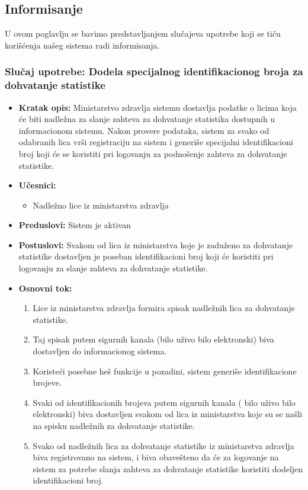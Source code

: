 \documentclass[titlepage]{article}
\begin{document}
\subsection{Informisanje}

U ovom poglavlju se bavimo predstavljanjem slučajeva upotrebe koji se tiču korišćenja našeg sistema radi informisanja.

\subsubsection{Slučaj upotrebe: Dodela specijalnog identifikacionog broja za dohvatanje statistike }
\begin{itemize}
    
\item \textbf{Kratak opis:} Ministarstvo zdravlja sistemu dostavlja podatke  o licima koja \'{c}e biti nadle\v{z}na za slanje zahteva za dohvatanje statistika dostupnih u informacionom sistemu. Nakon provere podataka, sistem za svako od odabranih lica vr\v{s}i registraciju na sistem i generi\v{s}e specijalni identifikacioni broj koji će se koristiti pri logovanju za podno\v{s}enje zahteva za dohvatanje statistike. 
\item \textbf{Učesnici:}
\begin{itemize}
    \item Nadle\v{z}no lice iz ministarstva zdravlja
\end{itemize}
 \item \textbf{Preduslovi:} Sistem je aktivan
 \item \textbf{Postuslovi:} Svakom od lica iz ministarstva koje je zadu\v{z}eno za dohvatanje statistike dostavljen je poseban identifikacioni broj koji će koristiti pri logovanju za slanje zahteva za dohvatanje statistike. 
 \item \textbf{Osnovni tok:}
 \begin{enumerate}
    \item Lice iz ministarstva zdravlja formira spisak nadle\v{z}nih lica za dohvatanje statistike.
    \item Taj spisak putem sigurnih kanala (bilo uživo bilo elektronski) biva dostavljen do informacionog sistema.
    \item Koriste\'{c}i posebne he\v{s} funkcije u pozadini, sistem generi\v{s}e identifikacione brojeve.
    \item Svaki od identifikacionih brojeva putem sigurnih kanala ( bilo u\v{z}ivo bilo elektronski) biva dostavljen svakom od lica iz ministarstva koje su se na\v{s}li na spisku nadle\v{z}nih za dohvatanje statistike.
    \item Svako od nadle\v{z}nih lica za dohvatanje statistike iz ministarstva zdravlja biva registrovano na sistem, i biva obave\v{s}teno da \'{c}e za logovanje na sistem za potrebe slanja zahteva za dohvatanje statistike koristiti dodeljen identifikacioni broj.
 \end{enumerate}
\end{itemize}
\end{document}
